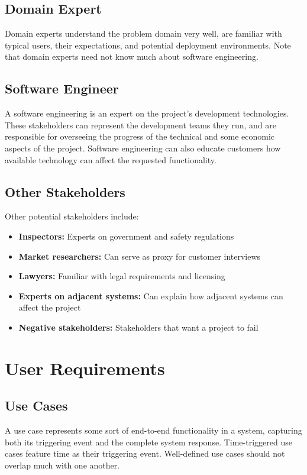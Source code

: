 \documentclass[12pt,titlepage]{article}
\begin{document}
    \subsection{Domain Expert}
      Domain experts understand the problem domain very well, are familiar with typical users, their expectations, and potential deployment environments.
      Note that domain experts need not know much about software engineering.

    \subsection{Software Engineer}
      A software engineering is an expert on the project's development technologies. These stakeholders can represent the development teams they run, and
      are responsible for overseeing the progress of the technical and some economic aspects of the project. Software engineering can also educate customers
      how available technology can affect the requested functionality.

    \subsection{Other Stakeholders}
      Other potential stakeholders include:
      \begin{itemize}
        \item \textbf{Inspectors:} Experts on government and safety regulations
        \item \textbf{Market researchers:} Can serve as proxy for customer interviews
        \item \textbf{Lawyers:} Familiar with legal requirements and licensing
        \item \textbf{Experts on adjacent systems:} Can explain how adjacent systems can affect the project
        \item \textbf{Negative stakeholders:} Stakeholders that want a project to fail
      \end{itemize}

  \newpage

  \section{User Requirements}

    \subsection{Use Cases}
      A use case represents some sort of end-to-end functionality in a system, capturing both its triggering event and the complete system response.
      Time-triggered use cases feature time as their triggering event. Well-defined use cases should not overlap much with one another.
\end{document}
